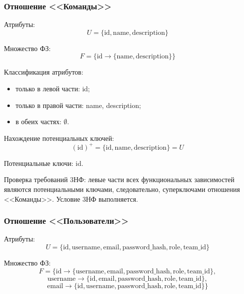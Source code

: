 \subsubsection{Отношение <<Команды>>}
Атрибуты:
\begin{equation*}
    U = \{\text{id}, \text{name}, \text{description}\}
\end{equation*}

Множество ФЗ:
\begin{equation*}
    F = \{ \text{id} \to \{\text{name}, \text{description}\} \}
\end{equation*}

Классификация атрибутов:
\begin{itemize}
    \item только в левой части: id; 
    \item только в правой части: {name, description};
    \item в обеих частях: $\emptyset$.
\end{itemize}

Нахождение потенциальных ключей:
\begin{equation*}
    (\text{id})^+ = \{\text{id}, \text{name}, \text{description}\} = U
\end{equation*}

Потенциальные ключи: id.

Проверка требований 3НФ: левые части всех функциональных зависимостей 
являются потенциальными ключами, следовательно, суперключами отношения <<Команды>>. Условие 3НФ выполняется.

\subsubsection{Отношение <<Пользователи>>}
Атрибуты:
\begin{equation*}
    U = \{\text{id}, \text{username}, \text{email}, \text{password\_hash}, \text{role}, \text{team\_id}\}
\end{equation*}

Множество ФЗ:
\begin{equation*}
    F = \{ \text{id} \to \{\text{username}, \text{email}, \text{password\_hash}, \text{role}, \text{team\_id}\},
\end{equation*}
\begin{equation*}
    \text{username} \to \{\text{id}, \text{email}, \text{password\_hash}, \text{role}, \text{team\_id}\},
\end{equation*}
\begin{equation*}
    \text{email} \to \{\text{id}, \text{username}, \text{password\_hash}, \text{role}, \text{team\_id}\} \}
\end{equation*}

